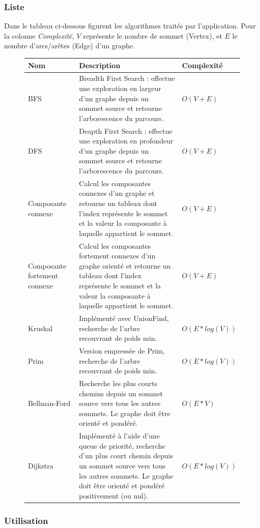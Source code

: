 \documentclass[french]{article}
\begin{document}
			\subsubsection{Liste}
			Dans le tableau ci-dessous figurent les algorithmes traités par l'application. Pour la colonne \textit{Complexité}, $V$ représente le nombre de sommet (Vertex), et $E$ le nombre d'arcs/arêtes (Edge) d'un graphe.
			\begin{figure}[H]
				\centering
				\begin{tabular}{L{3cm}L{10cm}l}
					\textbf{Nom} & \textbf{Description} & \textbf{Complexité}\\
					\hline
					BFS & Breadth First Search : effectue une exploration en largeur d'un graphe depuis un sommet source et retourne l'arborescence du parcours. & $O(V+E)$\\
					\hline
					DFS & Deapth First Search : effectue une exploration en profondeur d'un graphe depuis un sommet source et retourne l'arborescence du parcours. & $O(V+E)$\\
					\hline
					Composante connexe & Calcul les composantes connexes d'un graphe et retourne un tableau dont l'index représente le sommet et la valeur la composante à laquelle appartient le sommet. & $O(V+E)$\\
					\hline
					Composante fortement connexe & Calcul les composantes fortement connexes d'un graphe orienté et retourne un tableau dont l'index représente le sommet et la valeur la composante à laquelle appartient le sommet. & $O(V+E)$\\
					\hline
					Kruskal & Implémenté avec UnionFind, recherche de l'arbre recouvrant de poids min. & $O(E * log(V))$\\
					\hline
					Prim & Version empressée de Prim, recherche de l'arbre recouvrant de poids min. & $O(E * log(V))$\\
					\hline
					Bellman-Ford & Recherche les plus courts chemins depuis un sommet source vers tous les autres sommets. Le graphe doit être orienté et pondéré. & $O(E*V)$\\
					\hline
					Dijkstra & Implémenté à l'aide d'une queue de priorité, recherche d'un plus court chemin depuis un sommet source vers tous les autres sommets. Le graphe doit être orienté et pondéré positivement (ou nul). & $O(E * log(V))$\\
				\end{tabular}
			\end{figure}
			
			
			\subsubsection{Utilisation}
			
\end{document}
